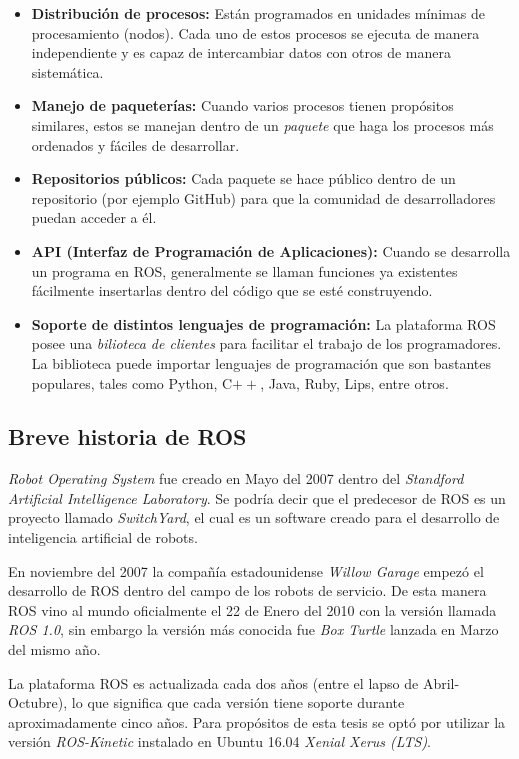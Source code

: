 \begin{itemize}
\item \textbf{Distribución de procesos:}
Están programados en unidades mínimas de procesamiento (nodos). Cada uno de estos procesos se ejecuta de manera independiente y es capaz de intercambiar datos con otros de manera sistemática.  
\item \textbf{Manejo de paqueterías:}
Cuando varios procesos tienen propósitos similares, estos se manejan dentro de un \textit{paquete} que haga los procesos más ordenados y fáciles de desarrollar.
\item \textbf{Repositorios públicos:}
Cada paquete se hace público dentro de un repositorio (por ejemplo GitHub) para que la comunidad de desarrolladores puedan acceder a él. 
\item \textbf{API (Interfaz de Programación de Aplicaciones):}
Cuando se desarrolla un programa en ROS, generalmente se llaman funciones ya existentes fácilmente insertarlas dentro del código que se esté construyendo.
\item \textbf{Soporte de distintos lenguajes de programación:}
La plataforma ROS posee una \textit{bilioteca de clientes} para facilitar el trabajo de los programadores. La biblioteca puede importar lenguajes de programación que son bastantes populares, tales como Python, C$++$, Java, Ruby, Lips, entre otros.
\end{itemize}
		\subsection*{Breve historia de ROS}
\textit{Robot Operating System} fue creado en Mayo del 2007 dentro del \textit{Standford Artificial Intelligence Laboratory}. Se podría decir que el predecesor de ROS es un proyecto llamado \textit{SwitchYard}, el cual es un software creado para el desarrollo de inteligencia artificial de robots.

En noviembre del 2007 la compañía estadounidense \textit{Willow Garage} empezó el desarrollo de ROS dentro del campo de los robots de servicio. De esta manera ROS vino al mundo oficialmente el 22 de Enero del 2010 con la versión llamada \textit{ROS 1.0}, sin embargo la versión más conocida fue \textit{Box Turtle} lanzada en Marzo del mismo año.

La plataforma ROS es actualizada cada dos años (entre el lapso de Abril-Octubre), lo que significa que cada versión tiene soporte durante aproximadamente cinco años. Para propósitos de esta tesis se optó por utilizar la versión \textit{ROS-Kinetic} instalado en Ubuntu 16.04 \textit{Xenial Xerus (LTS)}.
